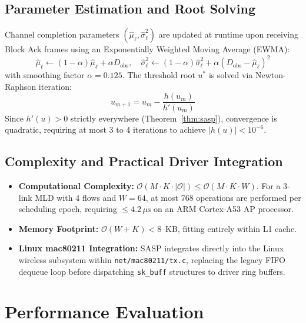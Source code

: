 \documentclass[10pt,journal,compsoc]{IEEEtran}
\begin{document}
\subsection{Parameter Estimation and Root Solving}
Channel completion parameters $(\hat{\mu}_\ell, \hat{\sigma}_\ell^2)$ are updated at runtime upon receiving Block Ack frames using an Exponentially Weighted Moving Average (EWMA):
\begin{equation}
    \hat{\mu}_\ell \leftarrow (1-\alpha) \hat{\mu}_\ell + \alpha D_{\text{obs}}, \quad \hat{\sigma}_\ell^2 \leftarrow (1-\alpha) \hat{\sigma}_\ell^2 + \alpha (D_{\text{obs}} - \hat{\mu}_\ell)^2
\end{equation}
with smoothing factor $\alpha = 0.125$. The threshold root $u^*$ is solved via Newton-Raphson iteration:
\begin{equation}
    u_{m+1} = u_m - \frac{h(u_m)}{h'(u_m)}
\end{equation}
Since $h'(u) > 0$ strictly everywhere (Theorem~\ref{thm:sasp}), convergence is quadratic, requiring at most 3 to 4 iterations to achieve $|h(u)| < 10^{-6}$.

\subsection{Complexity and Practical Driver Integration}
\begin{itemize}
    \item \textbf{Computational Complexity:} $\mathcal{O}(M \cdot K \cdot |\mathcal{O}|) \le \mathcal{O}(M \cdot K \cdot W)$. For a 3-link MLD with 4 flows and $W = 64$, at most 768 operations are performed per scheduling epoch, requiring $\le 4.2\,\mu\text{s}$ on an ARM Cortex-A53 AP processor.
    \item \textbf{Memory Footprint:} $\mathcal{O}(W + K) < 8$~KB, fitting entirely within L1 cache.
    \item \textbf{Linux mac80211 Integration:} SASP integrates directly into the Linux wireless subsystem within \texttt{net/mac80211/tx.c}, replacing the legacy FIFO dequeue loop before dispatching \texttt{sk\_buff} structures to driver ring buffers.
\end{itemize}

\section{Performance Evaluation}
\label{sec:eval}
\end{document}
